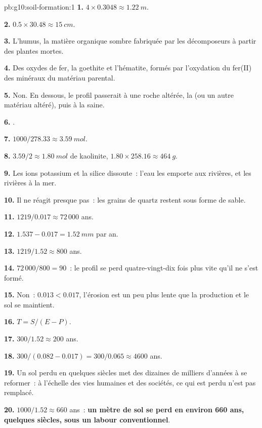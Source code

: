 \begin{solution}{pb:g10:soil-formation:1}
\textbf{1.} $4 \times 0.3048 \approx \qty{1.22}{m}$.

\textbf{2.} $0.5 \times 30.48 \approx \qty{15}{cm}$.

\textbf{3.} L'humus, la matière organique sombre fabriquée par les
décomposeurs à partir des plantes mortes.

\textbf{4.} Des oxydes de fer, la goethite et l'hématite, formés par
l'oxydation du fer(II) des minéraux du matériau parental.

\textbf{5.} Non. En dessous, le profil passerait à une roche altérée, la
 (ou un autre matériau altéré), puis à la  saine.

\textbf{6.} .

\textbf{7.} $1000/278.33 \approx \qty{3.59}{mol}$.

\textbf{8.} $3.59/2 \approx \qty{1.80}{mol}$ de kaolinite, $1.80 \times 258.16
\approx \qty{464}{g}$.

\textbf{9.} Les ions potassium et la silice dissoute~: l'eau les emporte aux
rivières, et les rivières à la mer.

\textbf{10.} Il ne réagit presque pas~: les grains de quartz restent sous
forme de sable.

\textbf{11.} $1219/0.017 \approx 72\,000$ ans.

\textbf{12.} $1.537 - 0.017 = \qty{1.52}{mm}$ par an.

\textbf{13.} $1219/1.52 \approx 800$ ans.

\textbf{14.} $72\,000/800 = 90$~: le profil se perd quatre-vingt-dix fois
plus vite qu'il ne s'est formé.

\textbf{15.} Non~: $0.013 < 0.017$, l'érosion est un peu plus lente que la
production et le sol se maintient.

\textbf{16.} $T = S/(E - P)$.

\textbf{17.} $300/1.52 \approx 200$ ans.

\textbf{18.} $300/(0.082 - 0.017) = 300/0.065 \approx 4600$ ans.

\textbf{19.} Un sol perdu en quelques siècles met des dizaines de milliers
d'années à se reformer~: à l'échelle des vies humaines et des sociétés, ce
qui est perdu n'est pas remplacé.

\textbf{20.} $1000/1.52 \approx 660$ ans~: \textbf{un mètre de sol se perd
en environ 660 ans, quelques siècles, sous un labour conventionnel}.
\end{solution}

